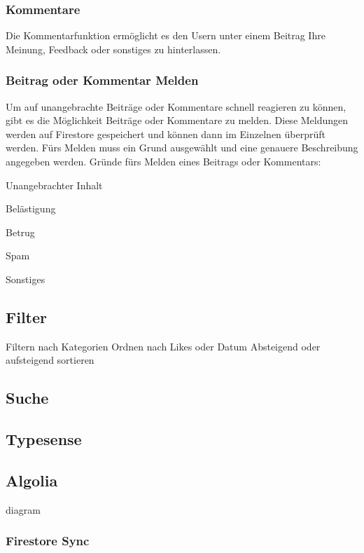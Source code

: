 \subsubsection{Kommentare}
\author{Sandin Habibovic}
Die Kommentarfunktion ermöglicht es den Usern unter einem Beitrag Ihre Meinung, Feedback oder sonstiges zu hinterlassen.

\subsubsection{Beitrag oder Kommentar Melden}
\author{Sandin Habibovic}
Um auf unangebrachte Beiträge oder Kommentare schnell reagieren zu können, gibt es die Möglichkeit Beiträge oder Kommentare zu melden. Diese Meldungen werden auf Firestore gespeichert und können dann im Einzelnen überprüft werden. Fürs Melden muss ein Grund ausgewählt und eine genauere Beschreibung angegeben werden.
Gründe fürs Melden eines Beitrags oder Kommentars:

\begin{compactitem}
    \item Unangebrachter Inhalt
    \item Belästigung
    \item Betrug
    \item Spam
    \item Sonstiges
\end{compactitem}

\subsection{Filter}
\author{Sandin Habibovic}
Filtern nach Kategorien
Ordnen nach Likes oder Datum
Absteigend oder aufsteigend sortieren

\subsection{Suche}
\subsection{Typesense}
\subsection{Algolia}
diagram
\subsubsection{Firestore Sync}

